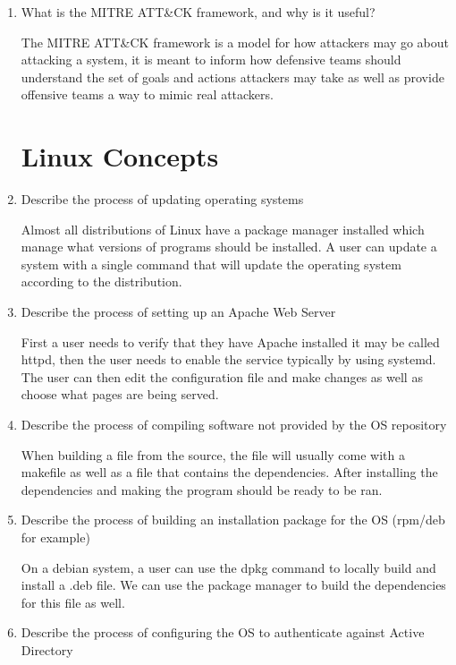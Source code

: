 \documentclass{exam}
\begin{document}
\begin{enumerate}
\begin{solution}
	\end{solution}
	\item What is the MITRE ATT\&CK framework, and why is it useful?
	\begin{solution}
		The MITRE ATT\&CK framework is a model for how attackers may go about attacking a system, it is meant to inform how defensive teams should understand the set of goals and actions attackers may take as well as provide offensive teams a way to mimic real attackers. 
	\end{solution}
	\section*{Linux Concepts}
	\item Describe the process of updating operating systems 
	\begin{solution}
		Almost all distributions of Linux have a package manager installed which manage what versions of programs should be installed. A user can update a system with a single command that will update the operating system according to the distribution.
	\end{solution}
	\item Describe the process of setting up an Apache Web Server
	\begin{solution}
		First a user needs to verify that they have Apache installed it may be called httpd, then the user needs to enable the service typically by using systemd. The user can then edit the configuration file and make changes as well as choose what pages are being served. 
	\end{solution}
	\item Describe the process of compiling software not provided by the OS repository 
	\begin{solution}
		When building a file from the source, the file will usually come with a makefile as well as a file that contains the dependencies. After installing the dependencies and making the program should be ready to be ran. 
	\end{solution}
	\item Describe the process of building an installation package for the OS (rpm/deb for example)
	\begin{solution}
		On a debian system, a user can use the dpkg command to locally build and install a .deb file. We can use the package manager to build the dependencies for this file as well.
	\end{solution}
	\item Describe the process of configuring the OS to authenticate against Active Directory 

\end{enumerate}
\end{document}
